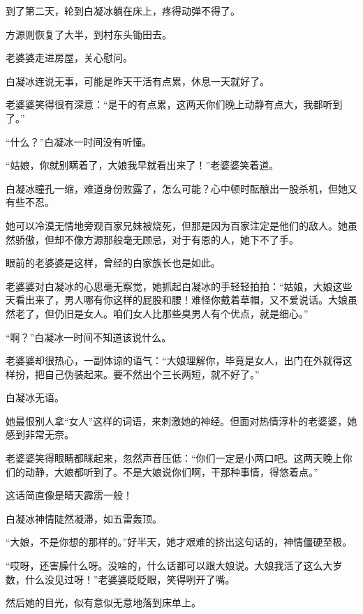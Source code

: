 
\begin{this_body}

到了第二天，轮到白凝冰躺在床上，疼得动弹不得了。

方源则恢复了大半，到村东头锄田去。

老婆婆走进房屋，关心慰问。

白凝冰连说无事，可能是昨天干活有点累，休息一天就好了。

老婆婆笑得很有深意：“是干的有点累，这两天你们晚上动静有点大，我都听到了。”

“什么？”白凝冰一时间没有听懂。

“姑娘，你就别瞒着了，大娘我早就看出来了！”老婆婆笑着道。

白凝冰瞳孔一缩，难道身份败露了，怎么可能？心中顿时酝酿出一股杀机，但她又有些不忍。

她可以冷漠无情地旁观百家兄妹被烧死，但那是因为百家注定是他们的敌人。她虽然骄傲，但却不像方源那般毫无顾忌，对于有恩的人，她下不了手。

眼前的老婆婆是这样，曾经的白家族长也是如此。

老婆婆对白凝冰的心思毫无察觉，她抓起白凝冰的手轻轻拍拍：“姑娘，大娘这些天看出来了，男人哪有你这样的屁股和腰！难怪你戴着草帽，又不爱说话。大娘虽然老了，但仍旧是女人。咱们女人比那些臭男人有个优点，就是细心。”

“啊？”白凝冰一时间不知道该说什么。

老婆婆却很热心，一副体谅的语气：“大娘理解你，毕竟是女人，出门在外就得这样扮，把自己伪装起来。要不然出个三长两短，就不好了。”

白凝冰无语。

她最恨别人拿“女人”这样的词语，来刺激她的神经。但面对热情淳朴的老婆婆，她感到非常无奈。

老婆婆笑得眼睛都眯起来，忽然声音压低：“你们一定是小两口吧。这两天晚上你们的动静，大娘都听到了。不是大娘说你们啊，干那种事情，得悠着点。”

这话简直像是晴天霹雳一般！

白凝冰神情陡然凝滞，如五雷轰顶。

“大娘，不是你想的那样的。”好半天，她才艰难的挤出这句话的，神情僵硬至极。

“哎呀，还害臊什么呀。没啥的，什么话都可以跟大娘说。大娘我活了这么大岁数，什么没见过呀！”老婆婆眨眨眼，笑得咧开了嘴。

然后她的目光，似有意似无意地落到床单上。


\end{this_body}
